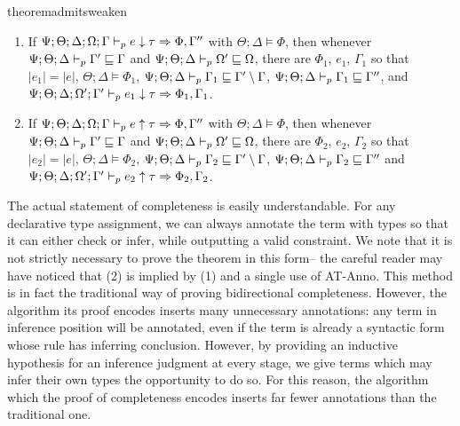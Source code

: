 \begin{restatable}{theorem}{admitsweaken}
\label{thm:admits-weaken}
~\begin{enumerate}
  \item If $\Psi ; \Theta ; \Delta ; \Omega ; \Gamma \vdash_p e \downarrow \tau \Rightarrow \Phi,\Gamma''$ with $\Theta ; \Delta \vDash \Phi$, then whenever $\Psi ; \Theta ; \Delta \vdash_p \Gamma' \sqsubseteq \Gamma$ and $\Psi ; \Theta ; \Delta \vdash_p \Omega' \sqsubseteq \Omega$, there are $\Phi_1$, $e_1$, $\Gamma_1$ so that $|e_1| = |e|$, $\Theta ; \Delta \vDash \Phi_1$, $\Psi ; \Theta ; \Delta \vdash_p \Gamma_1 \sqsubseteq \Gamma' \setminus \Gamma$, $\Psi ; \Theta ; \Delta \vdash_p \Gamma_1 \sqsubseteq \Gamma''$, and $\Psi ; \Theta ; \Delta ; \Omega' ; \Gamma' \vdash_p e_1 \downarrow \tau \Rightarrow \Phi_1,\Gamma_1$.
  \item If $\Psi ; \Theta ; \Delta ; \Omega ; \Gamma \vdash_p e \uparrow \tau \Rightarrow \Phi,\Gamma''$ with $\Theta ; \Delta \vDash \Phi$, then whenever $\Psi ; \Theta ; \Delta \vdash_p \Gamma' \sqsubseteq \Gamma$ and $\Psi ; \Theta ; \Delta \vdash_p \Omega' \sqsubseteq \Omega$, there are $\Phi_2$, $e_2$, $\Gamma_2$ so that $|e_2| = |e|$, $\Theta ; \Delta \vDash \Phi_2$, $\Psi ; \Theta ; \Delta \vdash_p \Gamma_2 \sqsubseteq \Gamma' \setminus \Gamma$, $\Psi ; \Theta ; \Delta \vdash_p \Gamma_2 \sqsubseteq \Gamma''$ and $\Psi ; \Theta ; \Delta ; \Omega' ; \Gamma' \vdash_p e_2 \uparrow \tau \Rightarrow \Phi_2,\Gamma_2$.
\end{enumerate}
\end{restatable}

The actual statement of completeness is easily understandable. For any declarative type assignment, we can always annotate the term with types so that it can either check or infer, while outputting a valid constraint. We note that it is not strictly necessary to prove the theorem in this form-- the careful reader may have noticed that (2) is implied by (1) and a single use of AT-Anno. This method is in fact the traditional way of proving bidirectional completeness. However, the algorithm its proof encodes inserts many unnecessary annotations: any term in inference position will be annotated, even if the term is already a syntactic form whose rule has inferring conclusion. However, by providing an inductive hypothesis for an inference judgment at every stage, we give terms which may infer their own types the opportunity to do so. For this reason, the algorithm which the proof of completeness encodes inserts far fewer annotations than the traditional one.

